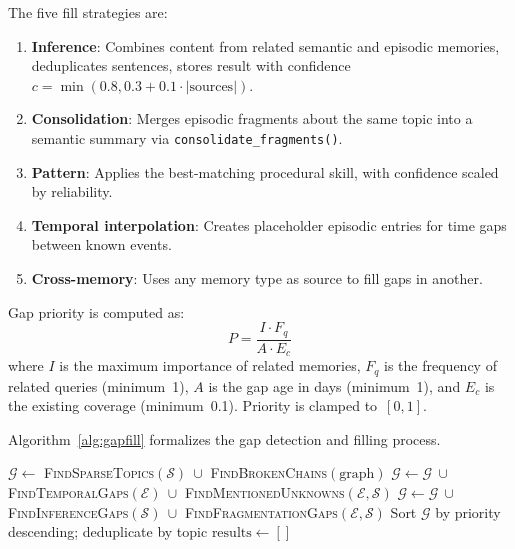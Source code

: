 \documentclass[runningheads]{llncs}
\begin{document}
The five fill strategies are:
\begin{enumerate}[leftmargin=*]
    \item \textbf{Inference}: Combines content from related semantic and episodic memories, deduplicates sentences, stores result with confidence $c = \min(0.8, 0.3 + 0.1 \cdot |\text{sources}|)$.
    \item \textbf{Consolidation}: Merges episodic fragments about the same topic into a semantic summary via \texttt{consolidate\_fragments()}.
    \item \textbf{Pattern}: Applies the best-matching procedural skill, with confidence scaled by reliability.
    \item \textbf{Temporal interpolation}: Creates placeholder episodic entries for time gaps between known events.
    \item \textbf{Cross-memory}: Uses any memory type as source to fill gaps in another.
\end{enumerate}

Gap priority is computed as:
\begin{equation}\label{eq:priority}
    P = \frac{I \cdot F_q}{A \cdot E_c}
\end{equation}
where $I$ is the maximum importance of related memories, $F_q$ is the frequency of related queries (minimum~1), $A$ is the gap age in days (minimum~1), and $E_c$ is the existing coverage (minimum~0.1). Priority is clamped to~$[0, 1]$.

Algorithm~\ref{alg:gapfill} formalizes the gap detection and filling process.

\begin{algorithm}[t]
\caption{Gap Detection and Filling}\label{alg:gapfill}
\DontPrintSemicolon
{}
\BlankLine
$\mathcal{G} \leftarrow$ \textsc{FindSparseTopics}$(\mathcal{S})\ \cup$ \textsc{FindBrokenChains}$(\text{graph})$\;
$\mathcal{G} \leftarrow \mathcal{G}\ \cup$ \textsc{FindTemporalGaps}$(\mathcal{E})\ \cup$ \textsc{FindMentionedUnknowns}$(\mathcal{E}, \mathcal{S})$\;
$\mathcal{G} \leftarrow \mathcal{G}\ \cup$ \textsc{FindInferenceGaps}$(\mathcal{S})\ \cup$ \textsc{FindFragmentationGaps}$(\mathcal{E}, \mathcal{S})$\;
\BlankLine
{}
Sort $\mathcal{G}$ by priority descending; deduplicate by topic\;
\BlankLine
$\text{results} \leftarrow []$\;
\end{algorithm}
\end{document}
